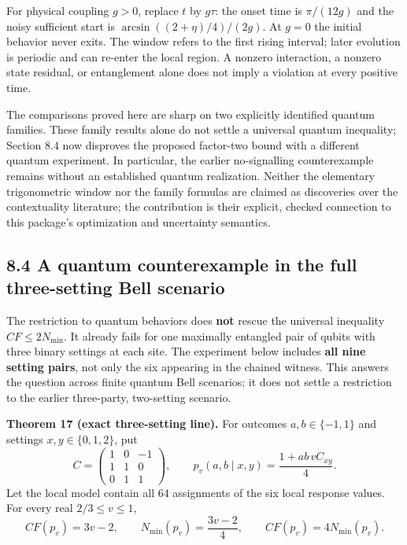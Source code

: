 \documentclass[
]{article}
\begin{document}
For physical coupling \(g>0\), replace \(t\) by \(g\tau\): the onset time is \(\pi/(12g)\) and the noisy sufficient start is \(\arcsin((2+\eta)/4)/(2g)\). At \(g=0\) the initial behavior never exits. The window refers to the first rising interval; later evolution is periodic and can re-enter the local region. A nonzero interaction, a nonzero state residual, or entanglement alone does not imply a violation at every positive time.

The comparisons proved here are sharp on two explicitly identified quantum families. These family results alone do not settle a universal quantum inequality; Section 8.4 now disproves the proposed factor-two bound with a different quantum experiment. In particular, the earlier no-signalling counterexample remains without an established quantum realization. Neither the elementary trigonometric window nor the family formulas are claimed as discoveries over the contextuality literature; the contribution is their explicit, checked connection to this package's optimization and uncertainty semantics.

\subsection{8.4 A quantum counterexample in the full three-setting Bell scenario}\label{a-quantum-counterexample-in-the-full-three-setting-bell-scenario}

The restriction to quantum behaviors does \textbf{not} rescue the universal inequality \(CF\le2N_{\min}\). It already fails for one maximally entangled pair of qubits with three binary settings at each site. The experiment below includes \textbf{all nine setting pairs}, not only the six appearing in the chained witness. This answers the question across finite quantum Bell scenarios; it does not settle a restriction to the earlier three-party, two-setting scenario.

\textbf{Theorem 17 (exact three-setting line).} For outcomes \(a,b\in\{-1,1\}\) and settings \(x,y\in\{0,1,2\}\), put
\[
C=\begin{pmatrix}1&0&-1\\1&1&0\\0&1&1\end{pmatrix},
\qquad
p_v(a,b\mid x,y)=\frac{1+ab\,v C_{xy}}4.
\]
Let the local model contain all \(64\) assignments of the six local response values. For every real \(2/3\le v\le1\),
\[
CF(p_v)=3v-2,\qquad N_{\min}(p_v)=\frac{3v-2}{4},
\qquad CF(p_v)=4N_{\min}(p_v).
\tag{38}
\]
\end{document}
